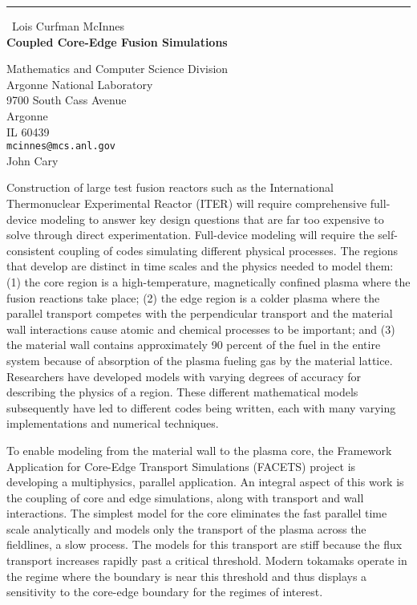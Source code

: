\documentclass{report}
\begin{document}
\begin{center}
\rule{6in}{1pt} \
{\large Lois Curfman McInnes \\
{\bf Coupled Core-Edge Fusion Simulations}}

Mathematics and Computer Science Division \\ Argonne National Laboratory \\ 9700 South Cass Avenue \\ Argonne \\ IL 60439
\\
{\tt mcinnes@mcs.anl.gov}\\
John Cary\end{center}

Construction of large test fusion reactors such as the International
Thermonuclear Experimental Reactor (ITER) will require comprehensive
full-device modeling to answer key design questions that are far too
expensive to solve through direct experimentation. Full-device modeling
will require the self-consistent coupling of codes simulating different
physical processes. The regions that develop are distinct in time scales
and the physics needed to model them: (1) the core region is a
high-temperature, magnetically confined plasma where the fusion reactions
take place; (2) the edge region is a colder plasma where the parallel
transport competes with the perpendicular transport and the material wall
interactions cause atomic and chemical processes to be important; and (3)
the material wall contains approximately 90 percent of the fuel in the
entire system because of absorption of the plasma fueling gas by the
material lattice. Researchers have developed models with varying degrees
of accuracy for describing the physics of a region. These different
mathematical models subsequently have led to different codes being
written, each with many varying implementations and numerical techniques.

To enable modeling from the material wall to the plasma core, the
Framework Application for Core-Edge Transport Simulations (FACETS)
project is developing a multiphysics, parallel application. An integral
aspect of this work is the coupling of core and edge simulations, along
with transport and wall interactions. The simplest model for the core
eliminates the fast parallel time scale analytically and models only the
transport of the plasma across the fieldlines, a slow process. The models
for this transport are stiff because the flux transport increases rapidly
past a critical threshold. Modern tokamaks operate in the regime where
the boundary is near this threshold and thus displays a sensitivity to
the core-edge boundary for the regimes of interest.
\end{document}
